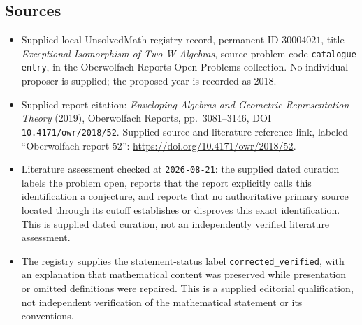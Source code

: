 \documentclass[11pt]{article}
\begin{document}
\subsection{Sources}
\begin{itemize}
\item Supplied local UnsolvedMath registry record, permanent ID \(30004021\), title \emph{Exceptional Isomorphism of Two W-Algebras}, source problem code \texttt{catalogue entry}, in the Oberwolfach Reports Open Problems collection. No individual proposer is supplied; the proposed year is recorded as 2018.
\item Supplied report citation: \emph{Enveloping Algebras and Geometric Representation Theory} (2019), Oberwolfach Reports, pp.\ 3081--3146, DOI \texttt{10.4171/owr/2018/52}. Supplied source and literature-reference link, labeled ``Oberwolfach report 52'': \url{https://doi.org/10.4171/owr/2018/52}.
\item Literature assessment checked at \texttt{2026-08-21}: the supplied dated curation labels the problem open, reports that the report explicitly calls this identification a conjecture, and reports that no authoritative primary source located through its cutoff establishes or disproves this exact identification. This is supplied dated curation, not an independently verified literature assessment.
\item The registry supplies the statement-status label \texttt{corrected\_verified}, with an explanation that mathematical content was preserved while presentation or omitted definitions were repaired. This is a supplied editorial qualification, not independent verification of the mathematical statement or its conventions.
\end{itemize}
\end{document}

